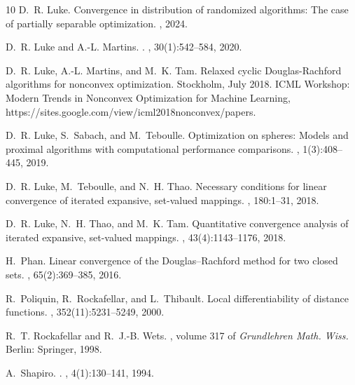 \documentclass[12pt]{article}
\theoremstyle{definition}
\begin{document}
\begin{thebibliography}{10}
D.~R. Luke.
\newblock Convergence in distribution of randomized algorithms: The case of
  partially separable optimization.
, 2024.

D.~R. Luke and A.-L. Martins.
.
, 30(1):542--584, 2020.

D.~R. Luke, A.-L. Martins, and M.~K. Tam.
\newblock Relaxed cyclic {D}ouglas-{R}achford algorithms for nonconvex
  optimization.
\newblock Stockholm, July 2018. ICML Workshop: Modern Trends in Nonconvex
  Optimization for Machine Learning,
  https://sites.google.com/view/icml2018nonconvex/papers.

D.~R. Luke, S.~Sabach, and M.~Teboulle.
\newblock Optimization on spheres: Models and proximal algorithms with
  computational performance comparisons.
, 1(3):408--445, 2019.

D.~R. Luke, M.~Teboulle, and N.~H. Thao.
\newblock Necessary conditions for linear convergence of iterated expansive,
  set-valued mappings.
, 180:1--31, 2018.

D.~R. Luke, N.~H. Thao, and M.~K. Tam.
\newblock Quantitative convergence analysis of iterated expansive, set-valued
  mappings.
, 43(4):1143--1176, 2018.

H.~Phan.
\newblock Linear convergence of the {D}ouglas--{R}achford method for two closed
  sets.
, 65(2):369--385, 2016.

R.~Poliquin, R.~Rockafellar, and L.~Thibault.
\newblock Local differentiability of distance functions.
, 352(11):5231--5249, 2000.

R.~T. Rockafellar and R.~J.-B. Wets.
, volume 317 of {\em Grundlehren Math.
  Wiss.}
\newblock Berlin: Springer, 1998.

A.~Shapiro.
.
, 4(1):130--141, 1994.

\end{thebibliography}
\end{document}
